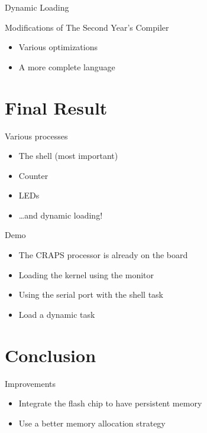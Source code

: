 \documentclass{beamer}
\begin{document}
      \begin{frame}{Dynamic Loading}
      \end{frame}

      \begin{frame}{Modifications of The Second Year's Compiler}
        \begin{itemize}
          \item Various optimizations
          \item A more complete language
        \end{itemize}
      \end{frame}

  \section{Final Result}
    \begin{frame}{Various processes}
      \begin{itemize}
        \item The shell (most important)
        \item Counter
        \item LEDs
        \item \dots and dynamic loading!
      \end{itemize}
    \end{frame}

    \begin{frame}{Demo}
      \begin{itemize}
        \item The CRAPS processor is already on the board
        \pause
        \item Loading the kernel using the monitor
      \end{itemize}
      \begin{figure}
        \centering
      \end{figure}
      \pause
      \begin{itemize}
        \item Using the serial port with the shell task
        \pause
        \item Load a dynamic task
      \end{itemize}
    \end{frame}

  \section{Conclusion}
    \begin{frame}{Improvements}
      \begin{itemize}
        \item Integrate the flash chip to have persistent memory
        \item Use a better memory allocation strategy
      \end{itemize}
    \end{frame}
\end{document}
